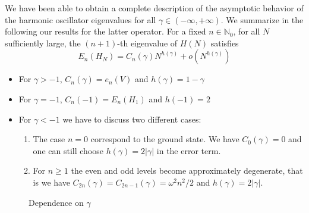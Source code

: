 \documentclass[12pt, reqno]{amsart}
\theoremstyle{definition}
\numberwithin{equation}{section}
\begin{document}
We have been able to obtain a complete description of the asymptotic behavior of the harmonic oscillator eigenvalues  for all $\gamma\in (-\infty,+\infty)$. We summarize in the following our results for the latter operator. For a fixed $n\in\mathbb{N}_0$, for all $N$ sufficiently large, the $(n+1)$-th eigenvalue of $H(N)$ satisfies \begin{equation*}
     E_n(H_N) = C_n(\gamma) N^{h(\gamma)} + o\left(N^{h(\gamma)}\right)
 \end{equation*}\begin{itemize}
     \item For $\gamma >-1$,  $C_n(\gamma) = e_n(V)$ and $h(\gamma) = 1-\gamma$
     \item For $\gamma =-1$, $ C_n(-1) = E_n(H_1)$ and $h(-1) = 2$
     \item For $\gamma <-1$ we have to discuss two different cases: \begin{enumerate}
     \item [(a)] The case $n= 0$ correspond to the ground state. We have $C_0(\gamma) = 0 $ and one can still choose $h(\gamma) = 2|\gamma|$ in the error term.
     \item [(b)] For $n\geq 1$ the even and odd levels become approximately degenerate, that is we have $C_{2n}(\gamma) = C_{2n-1}(\gamma) = \omega^2 n^2 /2$ and $h(\gamma) = 2|\gamma|$.
     \end{enumerate}
 \end{itemize} 
 
 \begin{figure}[h]
               \centering
               \caption{Dependence on $\gamma$}
               \label{fig: scaling with gamma}
           \end{figure}
\end{document}
